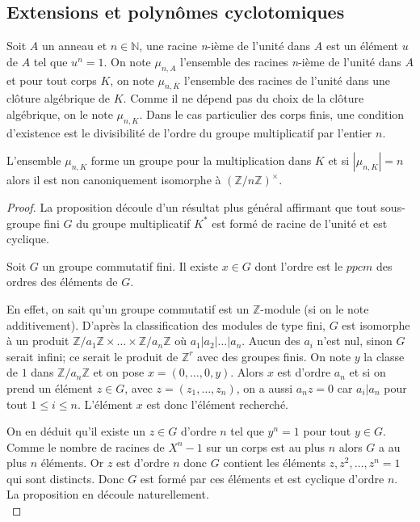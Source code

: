 \documentclass[a4paper]{article} %
\numberwithin{section}{part}
\numberwithin{equation}{section}
\newcommand\nroot[1]{\textit{#1}-ième}
\newcommand\zmodn[1]{\mathbb{Z}/#1\mathbb{Z}}
\newcommand\zmodninv[1]{(\mathbb{Z}/#1\mathbb{Z})^{\times}}
\newcommand\ZZ{\mathbb{Z}}
\newcommand\NN{\mathbb{N}}
\begin{document}
\subsection{Extensions et polynômes cyclotomiques}
Soit $A$ un anneau et $n\in\NN$, une racine \nroot{n} de l'unité dans $A$ est un
élément $u$ de $A$ tel que $u^n = 1$. On note $\mu_{n,A}$ l'ensemble des racines
\nroot{n} de l'unité dans $A$ et pour tout corps $K$, on note $\mu_{n,\bar{K}}$ 
l'ensemble des racines de l'unité dans une clôture algébrique de $K$. Comme il 
ne dépend pas du choix de la clôture algébrique, on le note $\mu_{n,K}$. Dans le
cas particulier des corps finis, une condition d'existence est le divisibilité
de l'ordre du groupe multiplicatif par l'entier $n$.\par

\begin{prop}
\label{prop:rootcycl}
L'ensemble $\mu_{n,K}$ forme un groupe pour la multiplication dans $K$ et si 
$|\mu_{n,K}| = n$ alors il est non canoniquement isomorphe à $\zmodninv{n}$.
\end{prop}
\begin{proof}
La proposition découle d'un résultat plus général affirmant que tout sous-groupe
fini $G$ du groupe multiplicatif $K^*$ est formé de racine de l'unité et est 
cyclique. 
\begin{lem}
Soit $G$ un groupe commutatif fini. Il existe $x\in G$ dont l'ordre est le 
$ppcm$ des ordres des éléments de $G$.
\end{lem}
En effet, on sait qu'un groupe commutatif est un $\ZZ$-module (si on le note 
additivement). D'après la classification des modules de type fini, $G$ est 
isomorphe à un produit $\zmodn{a_1}\times\dots\times\zmodn{a_n}$ où 
$a_1|a_2|\dots|a_n$. Aucun des $a_i$ n'est nul, sinon $G$ serait infini; 
ce serait le produit de $\ZZ^r$ avec des groupes finis. On note $y$ la classe 
de $1$ dans $\zmodn{a_n}$ et on pose $x = (0,\dots,0,y)$. Alors $x$ est d'ordre 
$a_n$ et si on prend un élément $z\in G$, avec $z = (z_1,\dots,z_n)$, on a aussi
$a_nz = 0$ car $a_i|a_n$ pour tout $1\leq i \leq n$. L'élément $x$ est donc
l'élément recherché.\par
On en déduit qu'il existe un $z\in G$ d'ordre $n$ tel que $y^n = 1$ pour 
tout $y\in G$. Comme le nombre de racines de $X^n - 1$ sur un corps est au plus 
$n$ alors $G$ a au plus $n$ éléments. Or $z$ est d'ordre $n$ donc $G$ contient 
les éléments $z, z^2,\dots,z^n = 1$ qui sont distincts. Donc $G$ est formé par 
ces éléments et est cyclique d'ordre $n$. La proposition en découle 
naturellement.\\
\end{proof}
\end{document}
